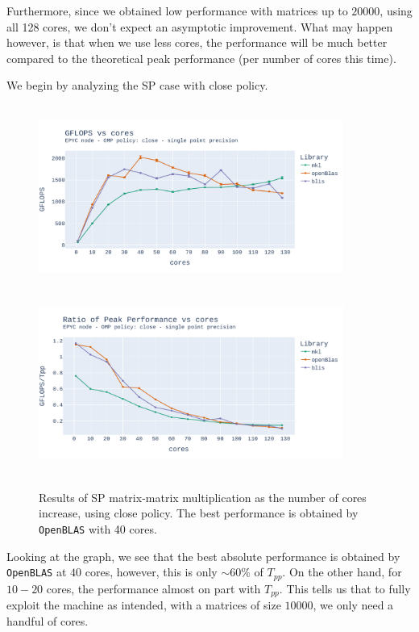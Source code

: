 \documentclass{report}
\begin{document}
Furthermore, since we obtained low performance with matrices up to $20000$, using 
all 128 cores, we don't expect an asymptotic improvement. What may happen however,
is that when we use less cores, the performance will be much better compared 
to the theoretical peak performance (per number of cores this time).

We begin by analyzing the SP case with close policy.

\begin{figure}[H]
\hspace*{-2.5cm}
\includegraphics[width=10cm, height=6cm]{./images/fixed_size_epyc_float_gflops_close.pdf}
\includegraphics[width=10cm, height=6cm]{./images/fixed_size_epyc_float_gflops_close_ratio.pdf}
\caption{\label{fig:fixed_size_epyc_float_close} Results of SP matrix-matrix multiplication 
as the number of cores increase, using close policy. The best performance is obtained 
by \texttt{OpenBLAS} with 40 cores.}
\end{figure}

Looking at the graph, we see that the best absolute performance is obtained by 
\texttt{OpenBLAS} at $40$ cores, however, this is only $\sim60\%$ of $T_{pp}$. 
On the other hand, for $10-20$ cores, the performance almost on part with $T_{pp}$. 
This tells us that to fully exploit the machine as intended, with a matrices of size 
$10000$, we only need a handful of cores.
\end{document}
